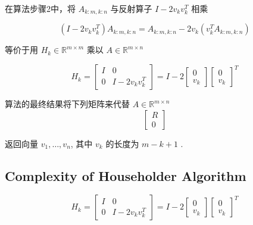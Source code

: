 \begin{theorem}
     在算法步骤2中，将 $ A_{k: m, k: n} $ 与反射算子 $ I-2 v_{k} v_{k}^{T} $ 相乘

    \begin{equation} \left(I-2 v_{k} v_{k}^{T}\right) A_{k: m, k: n}=A_{k: m, k: n}-2 v_{k}\left(v_{k}^{T} A_{k: m, k: n}\right) \end{equation}

    等价于用 $ H_{k} \in \mathbb{R}^{m \times m} $ 乘以 $ A \in \mathbb{R}^{m \times n}  $

    \begin{equation} H_{k}=\left[\begin{array}{cc}I & 0 \\ 0 & I-2 v_{k} v_{k}^{T}\end{array}\right]=I-2\left[\begin{array}{c}0 \\ v_{k}\end{array}\right]\left[\begin{array}{l}0 \\ v_{k}\end{array}\right]^{T} \end{equation}
\end{theorem}

   

算法的最终结果将下列矩阵来代替 $ A\in \mathbb{R}^{m \times n}  $
\begin{equation}
\left[\begin{array}{c}
R \\
0
\end{array}\right]
\end{equation}

返回向量 $ v_{1}, \ldots, v_{n} $, 其中 $ v_{k} $ 的长度为 $ m-k+1 $ .

\subsection{Complexity of Householder Algorithm}
\label{complexity:householder}

\begin{equation} H_{k}=\left[\begin{array}{cc}I & 0 \\ 0 & I-2 v_{k} v_{k}^{T}\end{array}\right]=I-2\left[\begin{array}{c}0 \\ v_{k}\end{array}\right]\left[\begin{array}{l}0 \\ v_{k}\end{array}\right]^{T} \end{equation}

